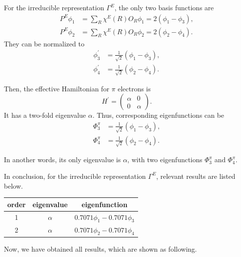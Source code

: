		For the irreducible representation $\Gamma^{E}$, the only two basis functions are
		\begin{align*}
			P^{E}\phi_1 &= \sum_{R} \chi^{E}(R) O_R \phi_1 = 2(\phi_1 - \phi_3 ), \\
			P^{E}\phi_2 &= \sum_{R} \chi^{E}(R) O_R \phi_2 = 2(\phi_2 - \phi_4 ).	
		\end{align*}
		They can be normalized to
		\begin{align*}
			\phi^\prime_3 &= \frac{1}{\sqrt{2}}(\phi_1 - \phi_3), \\
			\phi^\prime_4 &= \frac{1}{\sqrt{2}}(\phi_2 - \phi_4).
		\end{align*}
		
		Then, the effective Hamiltonian for $\pi$ electrons is
		\begin{equation*}
			H^\prime = \begin{pmatrix}
				\alpha	&	0	\\
				0	&	\alpha
				\end{pmatrix}.				
		\end{equation*}
		It has a two-fold eigenvalue $\alpha$. Thus, corresponding eigenfunctions can be
		\begin{align}
			\Phi^\pi_3 &= \frac{1}{\sqrt{2}}(\phi_1 - \phi_3), \\
			\Phi^\pi_4 &= \frac{1}{\sqrt{2}}(\phi_2 - \phi_4).
		\end{align}
		
		In another words, its only eigenvalue is $\alpha$, with two eigenfunctions $\Phi^\pi_3$ and $\Phi^\pi_4$.
		
		In conclusion, for the irreducible representation $\Gamma^{E}$, relevant results are listed below.
		
		\begin{center}
		\setlength{\abovecaptionskip}{0em}
		\begin{tabular}{ccc}\hline
		  order	&	eigenvalue		& 	eigenfunction	\\ \hline
			1	&$\alpha$& 	$0.7071\phi_1 - 0.7071 \phi_3$ \\ 
			2	&$\alpha$& 	$0.7071\phi_2 - 0.7071 \phi_4$ \\\hline
		\end{tabular}
		\end{center}
		
		Now, we have obtained all results, which are shown as following.
		
